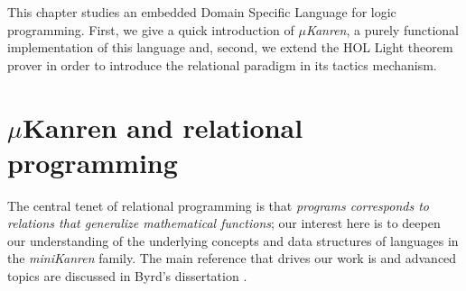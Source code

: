 
This chapter studies an embedded Domain Specific Language for logic
programming.  First, we give a quick introduction of \textit{$\mu$Kanren}, a
purely functional implementation of this language and, second, we extend the
HOL Light theorem prover in order to introduce the relational paradigm in its
tactics mechanism.

\section{$\mu$Kanren and relational programming}

The central tenet of relational programming is that \textit{programs
corresponds to relations that generalize mathematical functions}; our interest
here is to deepen our understanding of the underlying concepts and data
structures of languages in the \textit{miniKanren} family. The main reference
that drives our work is \citep{Friedman:Reasoned:Schemer} and advanced topics
are discussed in Byrd's dissertation \citep{Byrd:PhD}.

